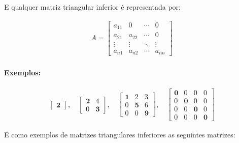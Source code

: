 E qualquer matriz triangular inferior é representada por:

\[
    \begin{matrix}
        A = \begin{bmatrix}
                a_{11} & 0      & \cdots & 0      \\
                a_{21} & a_{22} & \cdots & 0      \\
                \vdots & \vdots & \ddots & \vdots \\
                a_{n1} & a_{n2} & \cdots & a_{nn}
            \end{bmatrix}
    \end{matrix}
\]

\paragraph{Exemplos:}

\[
    \begin{matrix}
        \begin{bmatrix}
            \mathbf{2}
        \end{bmatrix},
        \quad
        \begin{bmatrix}
            \mathbf{2} & 4          \\
            0          & \mathbf{3}
        \end{bmatrix},
        \quad
        \begin{bmatrix}
            \mathbf{1} & 2          & 3          \\
            0          & \mathbf{5} & 6          \\
            0          & 0          & \mathbf{9}
        \end{bmatrix},
        \quad
        \begin{bmatrix}
            \mathbf{0} & 0          & 0          & 0          \\
            0          & \mathbf{0} & 0          & 0          \\
            0          & 0          & \mathbf{0} & 0          \\
            0          & 0          & 0          & \mathbf{0}
        \end{bmatrix}
    \end{matrix}
\]

E como exemplos de matrizes triangulares inferiores as seguintes matrizes:

